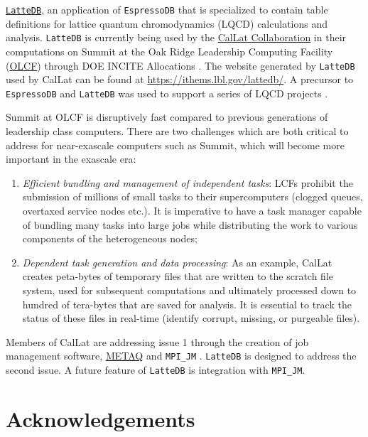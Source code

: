 \href{https://github.com/callat-qcd/lattedb/}{\texttt{LatteDB}}, an
application of \texttt{EspressoDB} that is specialized to contain table
definitions for lattice quantum chromodynamics (LQCD) calculations and
analysis. \texttt{LatteDB} is currently being used by the
\href{https://a51.lbl.gov/~callat/webhome/}{CalLat Collaboration} in
their computations on Summit at the Oak Ridge Leadership Computing
Facility (\href{https://www.olcf.ornl.gov}{OLCF}) through DOE INCITE
Allocations \cite{incite:2019, incite:2020}. The website generated by
\texttt{LatteDB} used by CalLat can be found at
\url{https://ithems.lbl.gov/lattedb/}. A precursor to
\texttt{EspressoDB} and \texttt{LatteDB} was used to support a series of
LQCD projects \cite{Nicholson:2018mwc, Chang:2018uxx}.

Summit at OLCF is disruptively fast compared to previous generations of
leadership class computers. There are two challenges which are both
critical to address for near-exascale computers such as Summit, which
will become more important in the exascale era:

\begin{enumerate}
\def\labelenumi{\arabic{enumi}.}
\item
  \emph{Efficient bundling and management of independent tasks}: LCFs
  prohibit the submission of millions of small tasks to their
  supercomputers (clogged queues, overtaxed service nodes etc.). It is
  imperative to have a task manager capable of bundling many tasks into
  large jobs while distributing the work to various components of the
  heterogeneous nodes;
\item
  \emph{Dependent task generation and data processing}: As an example,
  CalLat creates peta-bytes of temporary files that are written to the
  scratch file system, used for subsequent computations and ultimately
  processed down to hundred of tera-bytes that are saved for analysis.
  It is essential to track the status of these files in real-time
  (identify corrupt, missing, or purgeable files).
\end{enumerate}

Members of CalLat are addressing issue 1 through the creation of job
management software,
\href{https://github.com/evanberkowitz/metaq}{METAQ}
\cite{Berkowitz:2017vcp} and \texttt{MPI\_JM} \cite{Berkowitz:2018gqe;
Berkowitz:2017xna}. \texttt{LatteDB} is designed to address the
second issue. A future feature of \texttt{LatteDB} is integration with
\texttt{MPI\_JM}.

\hypertarget{acknowledgements}{%
\section{Acknowledgements}\label{acknowledgements}}

